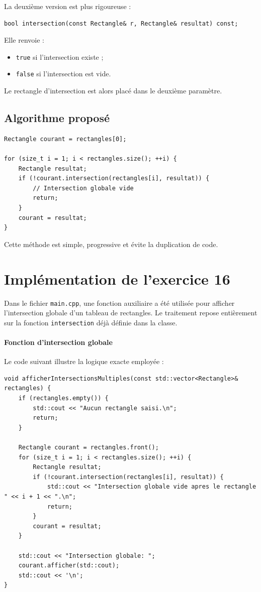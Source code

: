 \documentclass[12pt,a4paper]{article}
\begin{document}
La deuxi\`eme version est plus rigoureuse :
\begin{lstlisting}[style=cppstyle]
bool intersection(const Rectangle& r, Rectangle& resultat) const;
\end{lstlisting}

Elle renvoie :
\begin{itemize}[leftmargin=*]
    \item \texttt{true} si l'intersection existe ;
    \item \texttt{false} si l'intersection est vide.
\end{itemize}

Le rectangle d'intersection est alors plac\'e dans le deuxi\`eme param\`etre.

\subsection{Algorithme propos\'e}
\begin{lstlisting}[style=cppstyle]
Rectangle courant = rectangles[0];

for (size_t i = 1; i < rectangles.size(); ++i) {
    Rectangle resultat;
    if (!courant.intersection(rectangles[i], resultat)) {
        // Intersection globale vide
        return;
    }
    courant = resultat;
}
\end{lstlisting}

Cette m\'ethode est simple, progressive et \'evite la duplication de code.

\section{Impl\'ementation de l'exercice 16}
Dans le fichier \texttt{main.cpp}, une fonction auxiliaire a \'et\'e utilis\'ee pour afficher l'intersection globale d'un tableau de rectangles. Le traitement repose enti\`erement sur la fonction \texttt{intersection} d\'ej\`a d\'efinie dans la classe.

\paragraph{Fonction d'intersection globale} Le code suivant illustre la logique exacte employ\'ee :
\begin{lstlisting}[style=cppstyle]
void afficherIntersectionsMultiples(const std::vector<Rectangle>& rectangles) {
    if (rectangles.empty()) {
        std::cout << "Aucun rectangle saisi.\n";
        return;
    }

    Rectangle courant = rectangles.front();
    for (size_t i = 1; i < rectangles.size(); ++i) {
        Rectangle resultat;
        if (!courant.intersection(rectangles[i], resultat)) {
            std::cout << "Intersection globale vide apres le rectangle " << i + 1 << ".\n";
            return;
        }
        courant = resultat;
    }

    std::cout << "Intersection globale: ";
    courant.afficher(std::cout);
    std::cout << '\n';
}
\end{lstlisting}
\end{document}
